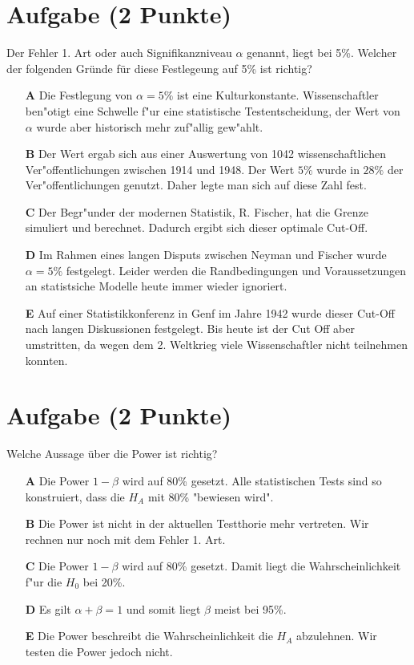 \documentclass[a4paper, 10pt]{scrartcl}\usepackage[]{graphicx}\usepackage[]{xcolor}
\begin{document}
\section{Aufgabe \hfill (2 Punkte)}

Der Fehler 1. Art oder auch Signifikanzniveau $\alpha$ genannt, liegt bei
5\%. Welcher der folgenden Gr{\"u}nde f{\"u}r diese Festlegeung auf 5\% ist richtig?



\begin{enumerate}
\item [\textbf{A} \msquare] Die Festlegung von $\alpha = 5\%$ ist eine Kulturkonstante. Wissenschaftler ben{"o}tigt eine Schwelle f{"u}r eine statistische Testentscheidung, der Wert von $\alpha$ wurde aber historisch mehr zuf{"a}llig gew{"a}hlt.
\item [\textbf{B} \msquare] Der Wert ergab sich aus einer Auswertung von 1042 wissenschaftlichen Ver{"o}ffentlichungen zwischen 1914 und 1948. Der Wert $5\%$ wurde in $28\%$ der Ver{"o}ffentlichungen genutzt. Daher legte man sich auf diese Zahl fest.
\item [\textbf{C} \msquare] Der Begr{"u}nder der modernen Statistik, R. Fischer, hat die Grenze simuliert und berechnet. Dadurch ergibt sich dieser optimale Cut-Off.
\item [\textbf{D} \msquare] Im Rahmen eines langen Disputs zwischen Neyman und Fischer wurde $\alpha = 5\%$ festgelegt. Leider werden die Randbedingungen und Voraussetzungen an statistsiche Modelle heute immer wieder ignoriert.
\item [\textbf{E} \msquare] Auf einer Statistikkonferenz in Genf im Jahre 1942 wurde dieser Cut-Off nach langen Diskussionen festgelegt. Bis heute ist der Cut Off aber umstritten, da wegen dem 2. Weltkrieg viele Wissenschaftler nicht teilnehmen konnten.
\end{enumerate}

\section{Aufgabe \hfill (2 Punkte)}

Welche Aussage {\"u}ber die Power ist richtig?



\begin{enumerate}
\item [\textbf{A} \msquare] Die Power $1-\beta$ wird auf 80\% gesetzt. Alle statistischen Tests sind so konstruiert, dass die $H_A$ mit 80\% "bewiesen wird".
\item [\textbf{B} \msquare] Die Power ist nicht in der aktuellen Testthorie mehr vertreten. Wir rechnen nur noch mit dem Fehler 1. Art.
\item [\textbf{C} \msquare] Die Power $1-\beta$ wird auf 80\% gesetzt. Damit liegt die Wahrscheinlichkeit f{"u}r die $H_0$ bei 20\%.
\item [\textbf{D} \msquare] Es gilt $\alpha + \beta = 1$ und somit liegt $\beta$ meist bei 95\%.
\item [\textbf{E} \msquare] Die Power beschreibt die Wahrscheinlichkeit die $H_A$ abzulehnen. Wir testen die Power jedoch nicht.
\end{enumerate}
\end{document}
